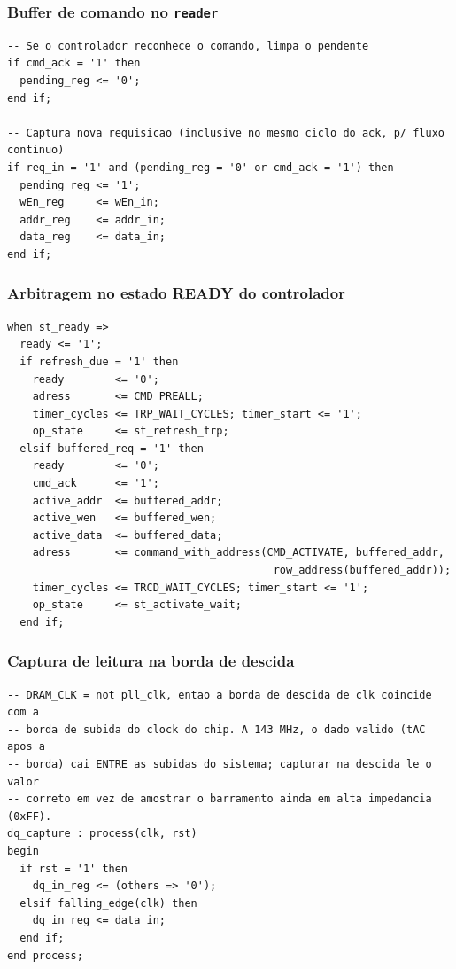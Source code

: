 \documentclass[12pt,a4paper]{article}
\begin{document}
\subsubsection{Buffer de comando no \texttt{reader}}
\begin{lstlisting}[caption={Captura do comando ate o acknowledge do controlador (reader.vhd).}]
-- Se o controlador reconhece o comando, limpa o pendente
if cmd_ack = '1' then
  pending_reg <= '0';
end if;

-- Captura nova requisicao (inclusive no mesmo ciclo do ack, p/ fluxo continuo)
if req_in = '1' and (pending_reg = '0' or cmd_ack = '1') then
  pending_reg <= '1';
  wEn_reg     <= wEn_in;
  addr_reg    <= addr_in;
  data_reg    <= data_in;
end if;
\end{lstlisting}

\subsubsection{Arbitragem no estado READY do controlador}
\begin{lstlisting}[caption={Refresh tem prioridade sobre uma nova requisicao externa (dram\_controller.vhd).}]
when st_ready =>
  ready <= '1';
  if refresh_due = '1' then
    ready        <= '0';
    adress       <= CMD_PREALL;
    timer_cycles <= TRP_WAIT_CYCLES; timer_start <= '1';
    op_state     <= st_refresh_trp;
  elsif buffered_req = '1' then
    ready        <= '0';
    cmd_ack      <= '1';
    active_addr  <= buffered_addr;
    active_wen   <= buffered_wen;
    active_data  <= buffered_data;
    adress       <= command_with_address(CMD_ACTIVATE, buffered_addr,
                                          row_address(buffered_addr));
    timer_cycles <= TRCD_WAIT_CYCLES; timer_start <= '1';
    op_state     <= st_activate_wait;
  end if;
\end{lstlisting}

\subsubsection{Captura de leitura na borda de descida}
\begin{lstlisting}[caption={A janela valida do dado cai entre as bordas de subida; capturar na descida acerta (dram\_controller.vhd).}]
-- DRAM_CLK = not pll_clk, entao a borda de descida de clk coincide com a
-- borda de subida do clock do chip. A 143 MHz, o dado valido (tAC apos a
-- borda) cai ENTRE as subidas do sistema; capturar na descida le o valor
-- correto em vez de amostrar o barramento ainda em alta impedancia (0xFF).
dq_capture : process(clk, rst)
begin
  if rst = '1' then
    dq_in_reg <= (others => '0');
  elsif falling_edge(clk) then
    dq_in_reg <= data_in;
  end if;
end process;
\end{lstlisting}
\end{document}
